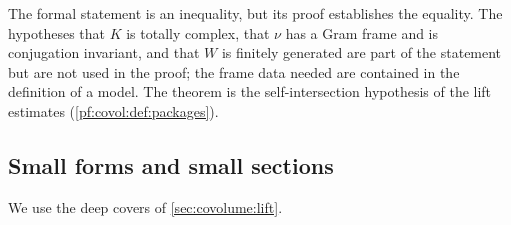 \begin{remark}\label{pf:covol:rem:equality}
The formal statement is an inequality, but its proof establishes the equality. The hypotheses that $K$
is totally complex, that $\nu$ has a Gram frame and is conjugation invariant, and that $W$ is finitely
generated are part of the statement but are not used in the proof; the frame data needed are contained in
the definition of a model. The theorem is the self-intersection hypothesis of the lift estimates
(\cref{pf:covol:def:packages}).
\end{remark}


\subsection{Small forms and small sections}\label{sec:pf:covol:small}

We use the deep covers of \cref{sec:covolume:lift}.

